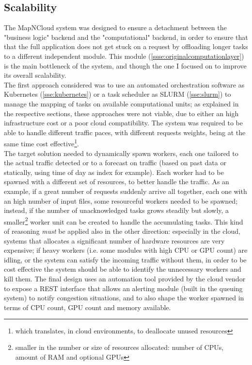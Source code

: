 \subsection{Scalability}
  The MapNCloud system was designed to ensure a detachment between the "business logic" backend and the "computational" backend, in order to ensure that that the full application does not get stuck on a request by offloading longer tasks to a different independent module. This module (\ref{ssse:originalcomputationlayer}) is the main bottleneck of the system, and though the one I focused on to improve its overall scalability.\\
  The first approach considered was to use an automated orchestration software as Kubernetes (\ref{sse:kubernetes}) or a task scheduler as SLURM (\ref{sse:slurm}) to manage the mapping of tasks on available computational units; as explained in the respective sections, these approaches were not viable, due to either an high infrastructure cost or a poor cloud compatibility. The system was required to be able to handle different traffic paces, with different requests weights, being at the same time cost effective\footnote{which translates, in cloud environments, to deallocate unused resources}.\\
  The target solution needed to dynamically spawn workers, each one tailored to the actual traffic detected or to a forecast on traffic (based on past data or statically, using time of day as index for example). Each worker had to be spawned with a different set of resources, to better handle the traffic. As an example, if a great number of requests suddenly arrive all together, each one with an high number of input files, some resourceful workers needed to be spawned; instead, if the number of unacknowledged tasks grows steadily but slowly, a smaller\footnote{smaller in the number or size of resources allocated: number of CPUs, amount of RAM and optional GPUs} worker unit can be created to handle the accumulating tasks. This kind of reasoning \textit{must} be applied also in the other direction: especially in the cloud, systems that allocates a significant number of hardware resources are very expensive; if heavy workers (i.e. some modules with high CPU or GPU count) are idling, or the system can satisfy the incoming traffic without them, in order to be cost effective the system should be able to identify the unnecessary workers and kill them. The final design uses an automation tool provided by the cloud vendor to expose a REST interface that allows an alerting module (built in the queuing system) to notify congestion situations, and to also shape the worker spawned in terms of CPU count, GPU count and memory available.

